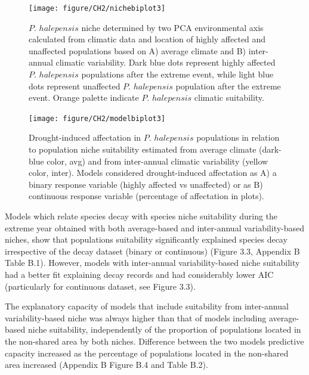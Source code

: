 \documentclass[11pt,twoside]{reedthesis}
\begin{document}
\setlength{\abovecaptionskip}{0pt}
\begin{figure}[hbt!]

{\centering \texttt{[image: figure/CH2/nichebiplot3]} 

}

\caption[$P$. $halepensis$ niche determined by average cliomate and by inter-annual climatic variability]{$P$. $halepensis$ niche determined by two PCA environmental axis calculated from climatic data and location of highly affected and unaffected populations based on A) average climate and B) inter-annual climatic variability. Dark blue dots represent highly affected $P$. $halepensis$ populations after the extreme event, while light blue dots represent unaffected $P$. $halepensis$ population after the extreme event. Orange palette indicate $P$. $halepensis$ climatic suitability.}\label{fig:Ch2plot2}
\end{figure}
\setlength{\abovecaptionskip}{0pt}
\begin{figure}[hbt!]

{\centering \texttt{[image: figure/CH2/modelbiplot3]} 

}

\caption[Drought-induced affectation in $P.$ $halepensis$ populations in relation to population niche suitability]{Drought-induced affectation in $P.$ $halepensis$ populations in relation to population niche suitability estimated from average climate (dark-blue color, avg) and from inter-annual climatic variability (yellow color, inter). Models considered drought-induced affectation as A) a binary response variable (highly affected vs unaffected) or as B) continuous response variable (percentage of affectation in plots).}\label{fig:Ch2plot3}
\end{figure}
Models which relate species decay with species niche suitability during
the extreme year obtained with both average-based and inter-annual
variability-based niches, show that populations suitability
significantly explained species decay irrespective of the decay dataset
(binary or continuous) (Figure 3.3, Appendix B Table B.1). However,
models with inter-annual variability-based niche suitability had a
better fit explaining decay records and had considerably lower AIC
(particularly for continuous dataset, see Figure 3.3).\par

The explanatory capacity of models that include suitability from
inter-annual variability-based niche was always higher than that of
models including average-based niche suitability, independently of the
proportion of populations located in the non-shared area by both niches.
Difference between the two models predictive capacity increased as the
percentage of populations located in the non-shared area increased
(Appendix B Figure B.4 and Table B.2).\par
\end{document}
